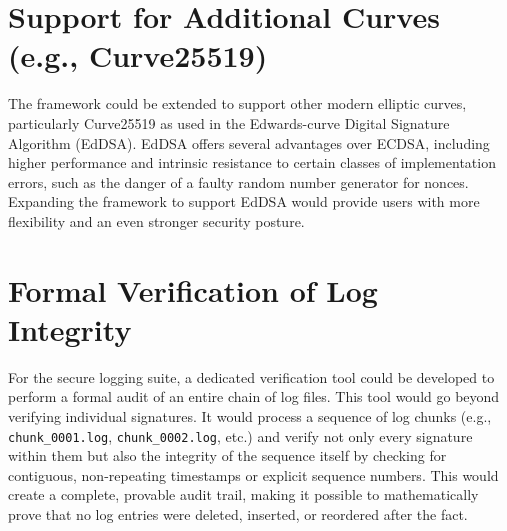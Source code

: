 \section{Support for Additional Curves (e.g., Curve25519)}
The framework could be extended to support other modern elliptic curves, particularly Curve25519 as used in the Edwards-curve Digital Signature Algorithm (EdDSA). EdDSA offers several advantages over ECDSA, including higher performance and intrinsic resistance to certain classes of implementation errors, such as the danger of a faulty random number generator for nonces. Expanding the framework to support EdDSA would provide users with more flexibility and an even stronger security posture.

\section{Formal Verification of Log Integrity}
For the secure logging suite, a dedicated verification tool could be developed to perform a formal audit of an entire chain of log files. This tool would go beyond verifying individual signatures. It would process a sequence of log chunks (e.g., \texttt{chunk\_0001.log}, \texttt{chunk\_0002.log}, etc.) and verify not only every signature within them but also the integrity of the sequence itself by checking for contiguous, non-repeating timestamps or explicit sequence numbers. This would create a complete, provable audit trail, making it possible to mathematically prove that no log entries were deleted, inserted, or reordered after the fact.